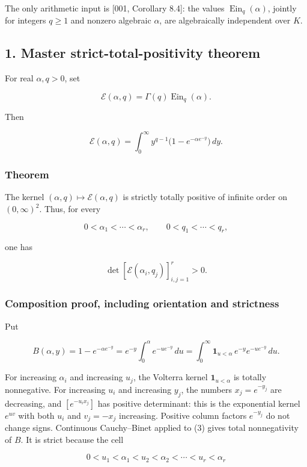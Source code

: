\documentclass[11pt]{article}
\theoremstyle{keio}
\theoremstyle{definition}
\theoremstyle{remark}
\newcommand{\Ein}{\operatorname{Ein}}
\begin{document}
The only arithmetic input is {[}001, Corollary 8.4{]}: the values
\(\Ein_q(\alpha)\), jointly for integers \(q\ge1\) and nonzero algebraic
\(\alpha\), are algebraically independent over \(K\).

\subsection{1. Master strict-total-positivity theorem}

For real \(\alpha,q>0\), set

\[
\mathcal E(\alpha,q)=\Gamma(q)\Ein_q(\alpha).
\]

Then

\[
\mathcal E(\alpha,q)
=\int_0^\infty y^{q-1}\bigl(1-e^{-\alpha e^{-y}}\bigr)\,dy. \tag{TP-1}
\]

\subsubsection{Theorem}

The kernel \((\alpha,q)\mapsto\mathcal E(\alpha,q)\) is strictly totally
positive of infinite order on \((0,\infty)^2\). Thus, for every

\[
0<\alpha_1<\cdots<\alpha_r,\qquad 0<q_1<\cdots<q_r,
\]

one has

\[
\det[\mathcal E(\alpha_i,q_j)]_{i,j=1}^r>0. \tag{TP-2}
\]

\subsubsection{Composition proof, including orientation and strictness}

Put

\[
B(\alpha,y)=1-e^{-\alpha e^{-y}}
=e^{-y}\int_0^\alpha e^{-u e^{-y}}\,du
=\int_0^\infty \mathbf1_{u<\alpha}\,e^{-y}e^{-u e^{-y}}\,du. \tag{TP-3}
\]

For increasing \(\alpha_i\) and increasing \(u_j\), the Volterra kernel
\(\mathbf1_{u<\alpha}\) is totally nonnegative. For increasing \(u_i\) and
increasing \(y_j\), the numbers \(x_j=e^{-y_j}\) are decreasing, and
\([e^{-u_i x_j}]\) has positive determinant: this is the exponential kernel
\(e^{uv}\) with both \(u_i\) and \(v_j=-x_j\) increasing. Positive column
factors \(e^{-y_j}\) do not change signs. Continuous Cauchy--Binet applied
to (3) gives total nonnegativity of \(B\). It is strict because the cell

\[
0<u_1<\alpha_1<u_2<\alpha_2<\cdots<u_r<\alpha_r
\]
\end{document}

